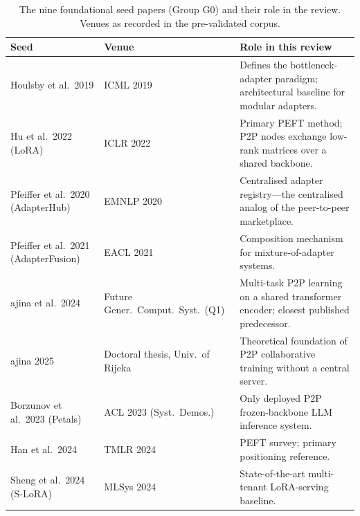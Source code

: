 \begin{table}[H]
\centering
\caption{The nine foundational seed papers (Group G0) and their role in the
review. Venues as recorded in the pre-validated corpus.}
\label{tab:g0_seeds}
\small
\setlength{\tabcolsep}{4pt}
\begin{tabular}{
  >{\raggedright\arraybackslash}p{}
  >{\raggedright\arraybackslash}p{}
  >{\raggedright\arraybackslash}p{}}
\toprule
\textbf{Seed} & \textbf{Venue} & \textbf{Role in this review} \\
\midrule
Houlsby et al.\ 2019 & ICML 2019 & Defines the bottleneck-adapter
paradigm; architectural baseline for modular adapters. \\
Hu et al.\ 2022 (LoRA) & ICLR 2022 & Primary PEFT method; P2P nodes
exchange low-rank matrices over a shared backbone. \\
Pfeiffer et al.\ 2020 (AdapterHub) & EMNLP 2020 & Centralised adapter
registry---the centralised analog of the peer-to-peer marketplace. \\
Pfeiffer et al.\ 2021 (AdapterFusion) & EACL 2021 & Composition mechanism
for mixture-of-adapter systems. \\
{\v{S}}ajina et al.\ 2024 & Future Gener.\ Comput.\ Syst.\ (Q1) &
Multi-task P2P learning on a shared transformer encoder; closest published
predecessor. \\
{\v{S}}ajina 2025 & Doctoral thesis, Univ.\ of Rijeka & Theoretical
foundation of P2P collaborative training without a central server. \\
Borzunov et al.\ 2023 (Petals) & ACL 2023 (Syst.~Demos.) & Only deployed P2P
frozen-backbone LLM inference system. \\
Han et al.\ 2024 & TMLR 2024 & PEFT survey; primary positioning reference. \\
Sheng et al.\ 2024 (S-LoRA) & MLSys 2024 & State-of-the-art multi-tenant
LoRA-serving baseline. \\
\bottomrule
\end{tabular}
\end{table}

